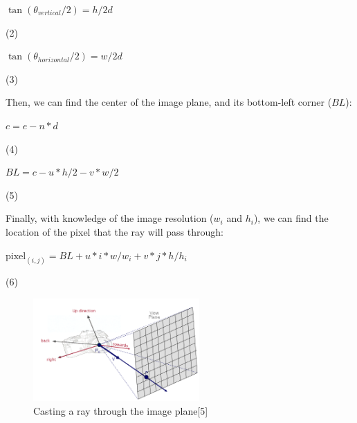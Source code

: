 \documentclass[journal]{IEEEtran}
\begin{document}
\begin{center}
$\tan(\theta_{vertical}/2) = h / 2d$
\end{center}

\begin{flushright}
\par 
(2)
\end{flushright}

\begin{center}
$\tan(\theta_{horizontal}/2) =w / 2d$
\end{center}

\begin{flushright}
\par 
(3)
\end{flushright}

Then, we can find the center of the image plane, and its bottom-left corner ($BL$):

\begin{center}
$c = e - n * d$
\end{center}

\begin{flushright}
\par 
(4)
\end{flushright}

\begin{center}
$BL = c - u * h /2 - v *w/2$
\end{center}

\begin{flushright}
\par 
(5)
\end{flushright}

Finally, with knowledge of the image resolution ($w_{i}$ and $h_{i}$), we can find the location of the pixel that the ray will pass through:

\begin{center}
$\text{pixel}_{(i,j)}= BL + u * i * w / w_{i} + v * j * h/h_{i}$
\end{center}

\begin{flushright}
\par 
(6)
\end{flushright}


\begin{figure}[!t]

\centering
\includegraphics[width=2.5in]{raycast_viewplane}
\caption{Casting a ray through the image plane[5]}
\label{raycast_imageplane}

\end{figure}
\end{document}

